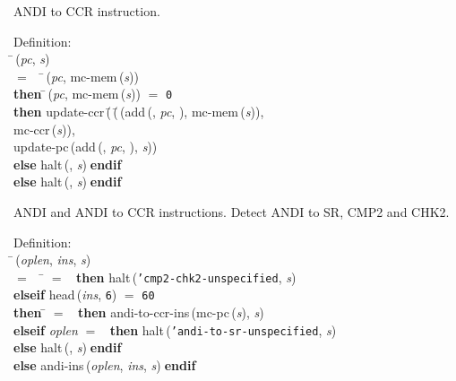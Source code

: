  ANDI to CCR instruction.
\begin{tabbing}{\sc Definition}: \\  
\=\,({\it{pc\/}}, {\it{s\/}}) \\ 
$=$$\;\;\;\;$\=\,({\it{pc\/}}, {\rm{mc-mem}}\,({\it{s\/}})) \\ 
{\bf then }\=\,({\it{pc\/}}, {\rm{mc-mem}}\,({\it{s\/}})) $=$ {\tt{0}} \\ 
{\bf then }{\rm{update-ccr}}\,(\=\,(\=\,({\rm{add}}\,({}, {\it{pc\/}}, {}), {\rm{mc-mem}}\,({\it{s\/}})), \\ 
{\rm{mc-ccr}}\,({\it{s\/}}))\-, \\ 
{\rm{update-pc}}\,({\rm{add}}\,({}, {\it{pc\/}}, {}), {\it{s\/}}))\- \\ 
{\bf else }{\rm{halt}}\,({}, {\it{s\/}})$\;${\bf  endif}\- \\ 
{\bf else }{\rm{halt}}\,({}, {\it{s\/}})$\;${\bf  endif}\-\-
\end{tabbing}

 ANDI and ANDI to CCR instructions.
 Detect ANDI to SR, CMP2 and CHK2.
\begin{tabbing}{\sc Definition}: \\  
\=\,({\it{oplen\/}}, {\it{ins\/}}, {\it{s\/}}) \\ 
$=$$\;\;\;\;$\= $=$ {}$\;\;${\bf then }{\rm{halt}}\,({\tt{'}}{\tt{cmp2-chk2-unspecified}}, {\it{s\/}}) \\ 
{\bf elseif }{\rm{head}}\,({\it{ins\/}}, {\tt{6}}) $=$ {\tt{60}} \\ 
{\bf then }\= $=$ {}$\;\;${\bf then }{\rm{andi-to-ccr-ins}}\,({\rm{mc-pc}}\,({\it{s\/}}), {\it{s\/}}) \\ 
{\bf elseif }{\it{oplen\/}} $=$ {}$\;\;${\bf then }{\rm{halt}}\,({\tt{'}}{\tt{andi-to-sr-unspecified}}, {\it{s\/}}) \\ 
{\bf else }{\rm{halt}}\,({}, {\it{s\/}})$\;${\bf  endif}\- \\ 
{\bf else }{\rm{andi-ins}}\,({\it{oplen\/}}, {\it{ins\/}}, {\it{s\/}})$\;${\bf  endif}\-\-
\end{tabbing}

